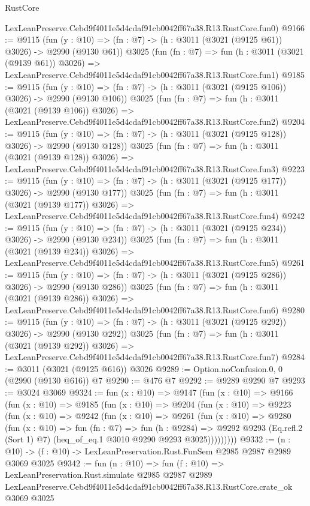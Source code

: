 \begin{lexlean}{RustCore}
\begin{coremodule}
    LexLeanPreserve.Cebd9f4011e5d4cdaf91cb0042ff67a38.R13.RustCore.fun0)
@9166 := @9115
    (fun (y : @10) => (fn : @7) -> (h : @3011 (@3021 (@9125 @61)) @3026) -> @2990 (@9130 @61))
    @3025
    (fun (fn : @7) =>
    fun (h : @3011 (@3021 (@9139 @61)) @3026) =>
    LexLeanPreserve.Cebd9f4011e5d4cdaf91cb0042ff67a38.R13.RustCore.fun1)
@9185 := @9115
    (fun (y : @10) => (fn : @7) -> (h : @3011 (@3021 (@9125 @106)) @3026) -> @2990 (@9130 @106))
    @3025
    (fun (fn : @7) =>
    fun (h : @3011 (@3021 (@9139 @106)) @3026) =>
    LexLeanPreserve.Cebd9f4011e5d4cdaf91cb0042ff67a38.R13.RustCore.fun2)
@9204 := @9115
    (fun (y : @10) => (fn : @7) -> (h : @3011 (@3021 (@9125 @128)) @3026) -> @2990 (@9130 @128))
    @3025
    (fun (fn : @7) =>
    fun (h : @3011 (@3021 (@9139 @128)) @3026) =>
    LexLeanPreserve.Cebd9f4011e5d4cdaf91cb0042ff67a38.R13.RustCore.fun3)
@9223 := @9115
    (fun (y : @10) => (fn : @7) -> (h : @3011 (@3021 (@9125 @177)) @3026) -> @2990 (@9130 @177))
    @3025
    (fun (fn : @7) =>
    fun (h : @3011 (@3021 (@9139 @177)) @3026) =>
    LexLeanPreserve.Cebd9f4011e5d4cdaf91cb0042ff67a38.R13.RustCore.fun4)
@9242 := @9115
    (fun (y : @10) => (fn : @7) -> (h : @3011 (@3021 (@9125 @234)) @3026) -> @2990 (@9130 @234))
    @3025
    (fun (fn : @7) =>
    fun (h : @3011 (@3021 (@9139 @234)) @3026) =>
    LexLeanPreserve.Cebd9f4011e5d4cdaf91cb0042ff67a38.R13.RustCore.fun5)
@9261 := @9115
    (fun (y : @10) => (fn : @7) -> (h : @3011 (@3021 (@9125 @286)) @3026) -> @2990 (@9130 @286))
    @3025
    (fun (fn : @7) =>
    fun (h : @3011 (@3021 (@9139 @286)) @3026) =>
    LexLeanPreserve.Cebd9f4011e5d4cdaf91cb0042ff67a38.R13.RustCore.fun6)
@9280 := @9115
    (fun (y : @10) => (fn : @7) -> (h : @3011 (@3021 (@9125 @292)) @3026) -> @2990 (@9130 @292))
    @3025
    (fun (fn : @7) =>
    fun (h : @3011 (@3021 (@9139 @292)) @3026) =>
    LexLeanPreserve.Cebd9f4011e5d4cdaf91cb0042ff67a38.R13.RustCore.fun7)
@9284 := @3011 (@3021 (@9125 @616)) @3026
@9289 := Option.noConfusion.{0, 0} (@2990 (@9130 @616)) @7
@9290 := @476 @7
@9292 := @9289 @9290 @7
@9293 := @3024 @3069
@9324 := fun (x : @10) =>
  @9147
    (fun (x : @10) =>
    @9166
      (fun (x : @10) =>
      @9185
        (fun (x : @10) =>
        @9204
          (fun (x : @10) =>
          @9223
            (fun (x : @10) =>
            @9242
              (fun (x : @10) =>
              @9261
                (fun (x : @10) =>
                @9280
                  (fun (x : @10) =>
                  fun (fn : @7) =>
                  fun (h : @9284) =>
                  @9292
                    @9293
                    (Eq.refl.{2} (Sort 1) @7)
                    (heq_of_eq.{1} @3010 @9290 @9293 @3025)))))))))
@9332 := (n : @10) -> (f : @10) -> LexLeanPreservation.Rust.FunSem @2985 @2987 @2989 @3069 @3025
@9342 := fun (n : @10) =>
  fun (f : @10) =>
  LexLeanPreservation.Rust.simulate
    @2985
    @2987
    @2989
    LexLeanPreserve.Cebd9f4011e5d4cdaf91cb0042ff67a38.R13.RustCore.crate_ok
    @3069
    @3025
\end{coremodule}
\end{lexlean}
